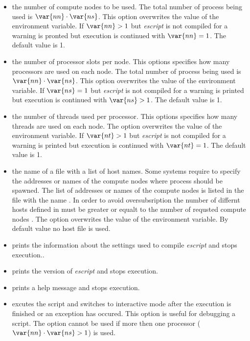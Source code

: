 \begin{itemize}

 \item[\programopt{-n} \var{nn}] the number of compute nodes  to be used. The total number of process being used is 
$\var{nn} \cdot \var{ns}$. This option overwrites the value of the  environment variable. If $\var{nn}>1$ but {\it escript}  is not compiled for \MPI a warning is pronted but execution is continued with $\var{nn}=1$. The default value is 1.
 
\item[\programopt{-s} \var{ns}] the number of processor slots per node. This options specifies how many \MPI processors are used on each node. The total number of process being used is 
$\var{nn} \cdot \var{ns}$. This option overwrites the value of the  environment variable. If $\var{ns}=1$ but {\it escript}  is not compiled for \MPI a warning is printed but execution is continued with $\var{ns}>1$. The default value is 1.

 \item[\programopt{-t} \var{nt}] the number of threads used per processor. This options specifies how many threads are used on each node. The option overwrites the value of the  environment variable. If $\var{nt}>1$ but {\it escript} is not compiled for \OPENMP a warning is printed but execution is continued with $\var{nt}=1$. The default value is 1.

 \item[\programopt{-f} \var{hostfile}] the name of a file with a list of host names. Some systems require to specify the addresses or names of the compute nodes where \MPI process should be spawned. The list of addresses or names of the compute nodes is listed in the file with the name . In order to avoid oversubsription the number of differnt
hosts defined in  must be greater or equalt to the number of requsted compute nodes . The option overwrites the value of the  environment variable. By default value no host file is used.
 \item[\programopt{-c}] prints the information about the settings used to compile {\it escript} and stops execution..
 \item[\programopt{-V}] prints the version of {\it escript} and stops execution.
 \item[\programopt{-h}] prints a help message and stops execution.
 \item[\programopt{-i}] excutes the script  and switches to interactive mode after the execution is finished or an exception has occured. This option is useful for debugging a script. The option cannot be used if more then one processor ($\var{nn} \cdot \var{ns}>1$) is used.


\end{itemize}
